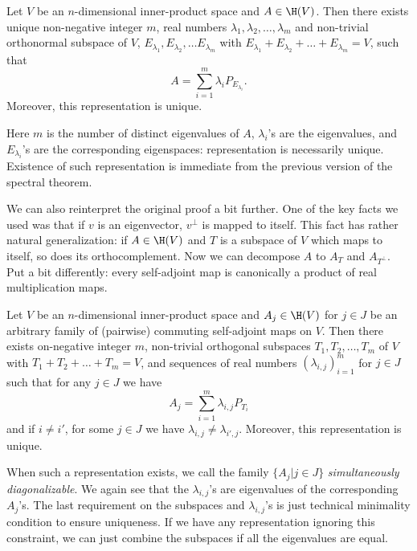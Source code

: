 \begin{lause}
	Let $V$ be an $n$-dimensional inner-product space and $A \in \H(V)$. Then there exists unique non-negative integer $m$, real numbers $\lambda_{1}, \lambda_{2}, \ldots, \lambda_{m}$ and non-trivial orthonormal subspace of $V$, $E_{\lambda_{1}}, E_{\lambda_{2}}, \ldots E_{\lambda_{m}}$ with $E_{\lambda_{1}} + E_{\lambda_{2}} + \ldots + E_{\lambda_{m}} = V$, such that
	\[
		A = \sum_{i = 1}^{m} \lambda_{i} P_{E_{\lambda_{i}}}.
	\]
	Moreover, this representation is unique.
\end{lause}

Here $m$ is the number of distinct eigenvalues of $A$, $\lambda_{i}$'s are the eigenvalues, and $E_{\lambda_{i}}$'s are the corresponding eigenspaces: representation is necessarily unique. Existence of such representation is immediate from the previous version of the spectral theorem.

We can also reinterpret the original proof a bit further. One of the key facts we used was that if $v$ is an eigenvector, $v^{\perp}$ is mapped to itself. This fact has rather natural generalization: if $A \in \H(V)$ and $T$ is a subspace of $V$ which maps to itself, so does its orthocomplement. Now we can decompose $A$ to $A_{T}$ and $A_{T^{\perp}}$. Put a bit differently: every self-adjoint map is canonically a product of real multiplication maps.

\begin{lause}
	Let $V$ be an $n$-dimensional inner-product space and $A_{j} \in \H(V)$ for $j \in J$ be an arbitrary family of (pairwise) commuting self-adjoint maps on $V$. Then there exists on-negative integer $m$, non-trivial orthogonal subspaces $T_{1}, T_{2}, \ldots, T_{m}$ of $V$ with $T_{1} + T_{2} + \ldots + T_{m} = V$, and sequences of real numbers $(\lambda_{i, j})_{i = 1}^{m}$ for $j \in J$ such that for any $j \in J$ we have
	\[
		A_{j} = \sum_{i = 1}^{m} \lambda_{i, j} P_{T_{i}}
	\]
	and if $i \neq i'$, for some $j \in J$ we have $\lambda_{i, j} \neq \lambda_{i', j}$. Moreover, this representation is unique.
\end{lause}

When such a representation exists, we call the family $\{ A_{j} | j \in J \}$ \textit{simultaneously diagonalizable}. We again see that the $\lambda_{i, j}$'s are eigenvalues of the corresponding $A_{j}$'s. The last requirement on the subspaces and $\lambda_{i, j}$'s is just technical minimality condition to ensure uniqueness. If we have any representation ignoring this constraint, we can just combine the subspaces if all the eigenvalues are equal.


